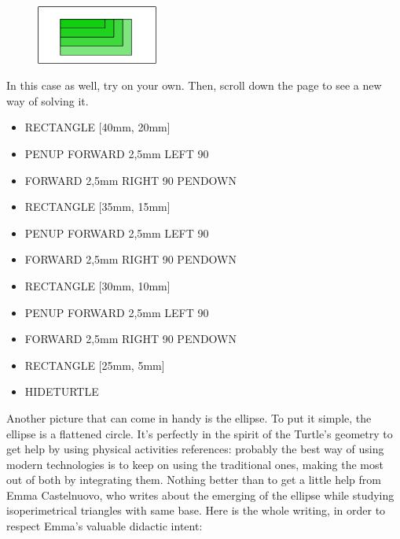 \begin{figure}[H]
   \centering
   \includegraphics[width=4.0cm,trim=4 4 8 4,clip]{./images/disegnare/disegnare-22.png}
   \label{dis-21}
\end{figure}

\vskip 1cm

In this case as well, try on your own. Then, scroll down the page to see a new way of solving it.

\pagebreak

\vskip 1cm
\begin{scriptsize}
\begin{minipage}{1.0\textwidth}
\begin{itemize}[itemsep=-3pt,parsep=2pt]
\item[] RECTANGLE [40mm, 20mm]
\item[] PENUP FORWARD 2,5mm LEFT 90
\item[] FORWARD 2,5mm RIGHT 90 PENDOWN   
\item[] RECTANGLE [35mm, 15mm]
\item[] PENUP FORWARD 2,5mm LEFT 90
\item[] FORWARD 2,5mm RIGHT 90 PENDOWN
\item[] RECTANGLE [30mm, 10mm]
\item[] PENUP FORWARD 2,5mm LEFT 90      
\item[] FORWARD 2,5mm RIGHT 90 PENDOWN
\item[] RECTANGLE [25mm, 5mm]
\item[] HIDETURTLE                      
\end{itemize}
\end{minipage}
\end{scriptsize}

\vskip 1cm

Another picture that can come in handy is the ellipse. To put it simple, the ellipse is a flattened circle. It's perfectly in the spirit of the Turtle's geometry to get help by using physical activities references: probably the best way of using modern technologies is to keep on using the traditional ones, making the most out of both by integrating them.
Nothing better than to get a little help from Emma Castelnuovo\cite{Castelnuovo}, who writes about the emerging of the ellipse while studying isoperimetrical triangles with same base. Here is the whole writing, in order to respect Emma's valuable didactic intent:


